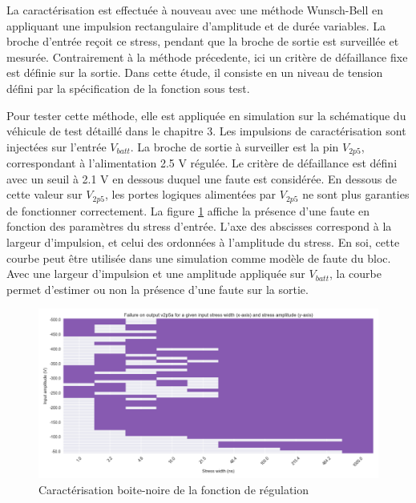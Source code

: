 La caractérisation est effectuée à nouveau avec une méthode Wunsch-Bell \cite{wunsch-bell} en appliquant une impulsion rectangulaire d'amplitude et de durée variables.
La broche d'entrée reçoit ce stress, pendant que la broche de sortie est surveillée et mesurée.
Contrairement à la méthode précedente, ici un critère de défaillance fixe est définie sur la sortie.
Dans cette étude, il consiste en un niveau de tension défini par la spécification de la fonction sous test.

Pour tester cette méthode, elle est appliquée en simulation sur la schématique du véhicule de test détaillé dans le chapitre 3.
Les impulsions de caractérisation sont injectées sur l'entrée $V_{batt}$.
La broche de sortie à surveiller est la pin $V_{2p5}$, correspondant à l'alimentation 2.5 V régulée.
Le critère de défaillance est défini avec un seuil à 2.1 V en dessous duquel une faute est considérée.
En dessous de cette valeur sur $V_{2p5}$, les portes logiques alimentées par $V_{2p5}$ ne sont plus garanties de fonctionner correctement.
La figure \ref{fig:cz-black-box} affiche la présence d'une faute en fonction des paramètres du stress d'entrée.
L'axe des abscisses correspond à la largeur d'impulsion, et celui des ordonnées à l'amplitude du stress.
En soi, cette courbe peut être utilisée dans une simulation comme modèle de faute du bloc.
Avec une largeur d'impulsion et une amplitude appliquée sur $V_{batt}$, la courbe permet d'estimer ou non la présence d'une faute sur la sortie.

\begin{figure}[!h]
  \centering
  \includegraphics[width=\textwidth]{src/1/figures/black_box_regulator.png}
  \caption{Caractérisation boite-noire de la fonction de régulation}
  \label{fig:cz-black-box}
\end{figure}

